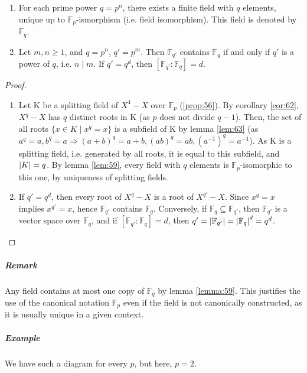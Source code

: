\begin{theorem}
  \label{thm:65}
  \begin{enumerate}
  \item For each prime power $q = p^n$, there exists a finite field with $q$ elements, unique up to $\mathbb{F}_p$-ismorphism (i.e. field isomorphism). This field is denoted by $\mathbb{F}_q$.
  \item Let $m, n \geq 1$, and $q = p^n$, $q' = p^m$. Then $\mathbb{F}_{q'}$ contains $\mathbb{F}_q$ if and only if $q'$ is a power of $q$, i.e. $n \mid m$. If  $q' = q^d$, then $[\mathbb{F}_{q'} : \mathbb{F}_{q}] = d$.
  \end{enumerate}
\end{theorem}

\begin{proof}
  \begin{enumerate}
  \item Let K be a splitting field of $X^4-X$ over $\mathbb{F}_p$ (\autoref{prop:56}). By corollary \autoref{cor:62}, $X^q-X$ has $q$ distinct roots in K (as $p$ does not divide $q-1$). Then, the set of all roots $\{ x \in K \mid x^q = x\}$ is a subfield of K by lemma \autoref{lem:63} (as $a^q = a, b^q = a \Rightarrow (a+b)^q = a + b, (ab)^q = ab, \left(a^{-1}\right)^q = a^{-1}$). As K is a splitting field, i.e. generated by all roots, it is equal to this subfield, and $\left|K\right| = q$. By lemma \autoref{lem:59}, every field with $q$ elements is $\mathbb{F}_p$-isomorphic to this one, by uniqueness of splitting fields.

  \item If $q' = q^d$, then every root of $X^q-X$ is a root of $X^{q'}-X$. Since $x^q = x$ implies $x^{q'} = x$, hence $\mathbb{F}_{q'}$ contains $\mathbb{F}_{q}$. Conversely, if $\mathbb{F}_q \subseteq \mathbb{F}_{q'}$, then $\mathbb{F}_{q'}$ is a vector space over $\mathbb{F}_q$, and if $[\mathbb{F}_{q'} : \mathbb{F}_q] = d$, then $q' = \left|\mathbb{F}_{q'}\right| = \left|\mathbb{F}_q\right|^d = q^d$.
  \end{enumerate}
\end{proof}

\subparagraph{Remark}

Any field contains at most one copy of $\mathbb{F}_q$ by lemma \autoref{lemma:59}. This justifies the use of the canonical notation $\mathbb{F}_p$ even if the field is not canonically constructed, as it is usually unique in a given context.

\subparagraph{Example}

We have such a diagram for every $p$, but here, $p = 2$.

